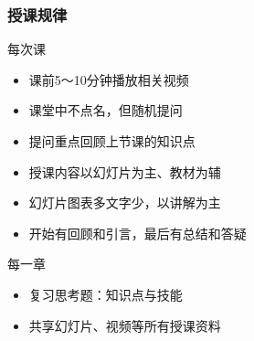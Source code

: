 
\begin{frame}
  \frametitle{授课规律}
  \begin{block}{每次课}
    \begin{itemize}
      \item 课前5～10分钟播放相关视频
      \item 课堂中不点名，但随机提问
      \item 提问重点回顾上节课的知识点
      \item 授课内容以幻灯片为主、教材为辅
      \item 幻灯片图表多文字少，以讲解为主
      \item 开始有回顾和引言，最后有总结和答疑
    \end{itemize}
  \end{block}
  \pause
  \begin{block}{每一章}
    \begin{itemize}
      \item 复习思考题：知识点与技能
      \item 共享幻灯片、视频等所有授课资料
    \end{itemize}
  \end{block}
\end{frame}

